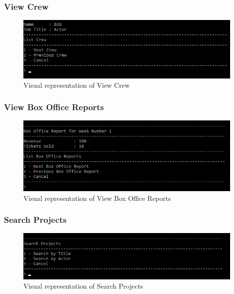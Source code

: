 \documentclass[
  english,
  a4paper,
,tablecaptionabove
]{scrartcl}
\begin{document}
\newpage

\hypertarget{view-crew}{%
\subsubsection{View Crew}\label{view-crew}}

\begin{figure}
\centering
\includegraphics{images/ui-screenshots/list-projects-view-crew.png}
\caption{Visual representation of View Crew}
\end{figure}

\newpage

\hypertarget{view-box-office-reports}{%
\subsubsection{View Box Office Reports}\label{view-box-office-reports}}

\begin{figure}
\centering
\includegraphics{images/ui-screenshots/list-projects-view-box-office-reports.png}
\caption{Visual representation of View Box Office Reports}
\end{figure}

\newpage

\hypertarget{search-projects}{%
\subsubsection{Search Projects}\label{search-projects}}

\begin{figure}
\centering
\includegraphics{images/ui-screenshots/search-projects.png}
\caption{Visual representation of Search Projects}
\end{figure}
\end{document}
